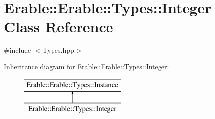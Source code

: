 \hypertarget{class_erable_1_1_erable_1_1_types_1_1_integer}{}\section{Erable\+::Erable\+::Types\+::Integer Class Reference}
\label{class_erable_1_1_erable_1_1_types_1_1_integer}


{\ttfamily \#include $<$Types.\+hpp$>$}

Inheritance diagram for Erable\+::Erable\+::Types\+::Integer\+:\begin{figure}[H]
\begin{center}
\leavevmode
\includegraphics[height=2.000000cm]{class_erable_1_1_erable_1_1_types_1_1_integer}
\end{center}
\end{figure}
